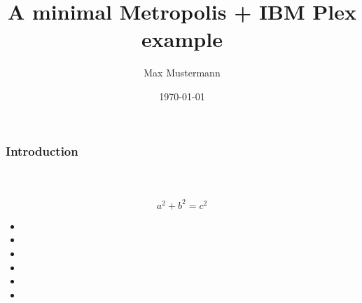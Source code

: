 \documentclass[12pt,ngerman]{beamer}
\title{A minimal Metropolis + IBM Plex example}
\date{\today}
\author{Max Mustermann}
\institute{The Name of the Institute}
\begin{document}
 
\begin{frame}
	 \maketitle
\end{frame}
 
\begin{frame}
\frametitle{Introduction}
\framesubtitle{~}
 
\[ a^2 + b^2 = c^2 \]
 
\begin{itemize}
\item 
\item 
\item 
\item 
\item 
\item 
\end{itemize}
\end{frame}
 
\end{document}
